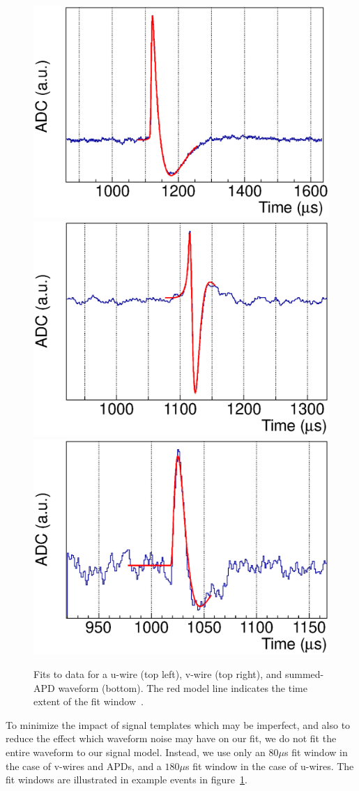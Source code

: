 \begin{figure}
\begin{center}
\includegraphics[keepaspectratio=true,width=.49\textwidth]{U_Wire_Fit.eps}
\includegraphics[keepaspectratio=true,width=.49\textwidth]{V_Wire_Fit.eps}
\includegraphics[keepaspectratio=true,width=.49\textwidth]{APD_Sum_Fit.eps}
\end{center}
\renewcommand{\baselinestretch}{1}
\small\normalsize
\begin{quote}
\caption{Fits to data for a u-wire (top left), v-wire (top right), and summed-APD waveform (bottom).  The red model line indicates the time extent of the fit window~\cite{ReconstructionDocument}.}
\label{fig:ReconExampleFits}
\end{quote}
\end{figure}
\renewcommand{\baselinestretch}{2}
\small\normalsize

To minimize the impact of signal templates which may be imperfect, and also to reduce the effect which waveform noise may have on our fit, we do not fit the entire waveform to our signal model.  Instead, we use only an $80 \mu$s fit window in the case of v-wires and APDs, and a $180 \mu$s fit window in the case of u-wires.  The fit windows are illustrated in example events in figure~\ref{fig:ReconExampleFits}.

